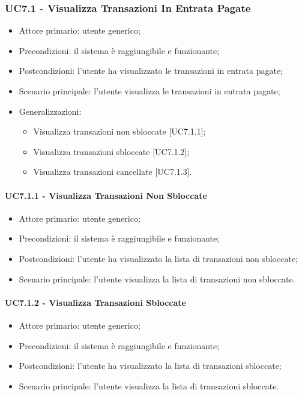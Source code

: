 \subsubsection{UC7.1 - Visualizza Transazioni In Entrata Pagate}

\begin{itemize}
    \item Attore primario: utente generico;
    \item Precondizioni: il sistema è raggiungibile e funzionante;
    \item Postcondizioni: l'utente ha visualizzato le transazioni in entrata pagate;
    \item Scenario principale: l'utente visualizza le transazioni in entrata pagate;
    \item Generalizzazioni:
          \begin{itemize}
              \item Visualizza transazioni non sbloccate [UC7.1.1];
              \item Visualizza transazioni sbloccate [UC7.1.2];
              \item Visualizza transazioni cancellate [UC7.1.3].
          \end{itemize}
\end{itemize}

\paragraph{UC7.1.1 - Visualizza Transazioni Non Sbloccate}

\begin{itemize}
    \item Attore primario: utente generico;
    \item Precondizioni: il sistema è raggiungibile e funzionante;
    \item Postcondizioni: l'utente ha visualizzato la lista di transazioni non sbloccate;
    \item Scenario principale: l'utente visualizza la lista di transazioni non sbloccate.
\end{itemize}

\paragraph{UC7.1.2 - Visualizza Transazioni Sbloccate}

\begin{itemize}
    \item Attore primario: utente generico;
    \item Precondizioni: il sistema è raggiungibile e funzionante;
    \item Postcondizioni: l'utente ha visualizzato la lista di transazioni sbloccate;
    \item Scenario principale: l'utente visualizza la lista di transazioni sbloccate.
\end{itemize}

